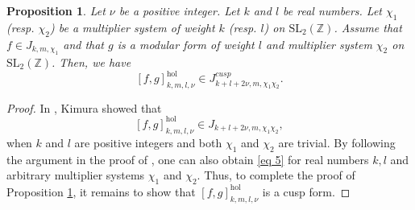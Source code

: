 \documentclass[11pt]{amsart}
\newtheorem{prop}[thm]{Proposition}
\theoremstyle{definition}
\theoremstyle{remark}
\numberwithin{equation}{section}
\renewcommand{\(}{\left(}
\renewcommand{\)}{\right)}
\begin{document}
\begin{prop}\cite[Proposition 1.3]{K}\label{prop 1}
    Let $\nu$ be a positive integer. 
    Let $k$ and $l$ be real numbers.
    Let $\chi_1$ (resp. $\chi_2$) be a multiplier system of weight $k$ (resp. $l$) on $\mathrm{SL}_{2}(\mathbb{Z})$.
    Assume that $f\in J_{k,m,\chi_1}$ and that $g$ is a modular form of weight $l$ and multiplier system $\chi_2$ on $\mathrm{SL}_{2}(\mathbb{Z})$. 
    Then, we have 
    \[[f,g]^{\mathrm{hol}}_{k,m,l,\nu}\in J^{cusp}_{k+l+2\nu,m,\chi_1\chi_2}. \]
\end{prop}
\begin{proof}
    In \cite{K}, Kimura showed that 
    \begin{equation}\label{eq 5}
        [f,g]^{\mathrm{hol}}_{k,m,l,\nu}\in J_{k+l+2\nu,m,\chi_{1}\chi_2}, 
    \end{equation}
    when $k$ and $l$ are positive integers and both $\chi_1$ and $\chi_2$ are trivial. 
    By following the argument in the proof of  \cite[Proposition 1.3]{K}, one can also obtain \eqref{eq 5} for real numbers $k,l$ and arbitrary multiplier systems $\chi_1$ and $\chi_2$.
    Thus, to complete the proof of Proposition \ref{prop 1}, it remains to show that $[f,g]^{\mathrm{hol}}_{k,m,l,\nu}$ is a cusp form.


\end{proof}
\end{document}
